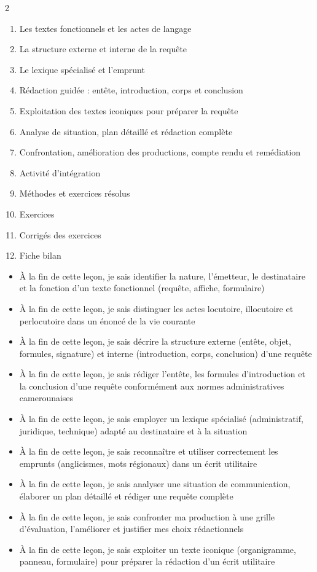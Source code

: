\documentclass[11pt]{article}
\begin{document}
\begin{sommaire}
\begin{multicols}{2}
\begin{enumerate}
\item Les textes fonctionnels et les actes de langage
\item La structure externe et interne de la requête
\item Le lexique spécialisé et l'emprunt
\item Rédaction guidée : entête, introduction, corps et conclusion
\item Exploitation des textes iconiques pour préparer la requête
\item Analyse de situation, plan détaillé et rédaction complète
\item Confrontation, amélioration des productions, compte rendu et remédiation
\item Activité d'intégration
\item Méthodes et exercices résolus
\item Exercices
\item Corrigés des exercices
\item Fiche bilan
\end{enumerate}
\end{multicols}
\end{sommaire}

\begin{objectifs}
\begin{itemize}
\item À la fin de cette leçon, je sais identifier la nature, l'émetteur, le destinataire et la fonction d'un texte fonctionnel (requête, affiche, formulaire)
\item À la fin de cette leçon, je sais distinguer les actes locutoire, illocutoire et perlocutoire dans un énoncé de la vie courante
\item À la fin de cette leçon, je sais décrire la structure externe (entête, objet, formules, signature) et interne (introduction, corps, conclusion) d'une requête
\item À la fin de cette leçon, je sais rédiger l'entête, les formules d'introduction et la conclusion d'une requête conformément aux normes administratives camerounaises
\item À la fin de cette leçon, je sais employer un lexique spécialisé (administratif, juridique, technique) adapté au destinataire et à la situation
\item À la fin de cette leçon, je sais reconnaître et utiliser correctement les emprunts (anglicismes, mots régionaux) dans un écrit utilitaire
\item À la fin de cette leçon, je sais analyser une situation de communication, élaborer un plan détaillé et rédiger une requête complète
\item À la fin de cette leçon, je sais confronter ma production à une grille d'évaluation, l'améliorer et justifier mes choix rédactionnels
\item À la fin de cette leçon, je sais exploiter un texte iconique (organigramme, panneau, formulaire) pour préparer la rédaction d'un écrit utilitaire
\end{itemize}
\end{objectifs}
\end{document}
